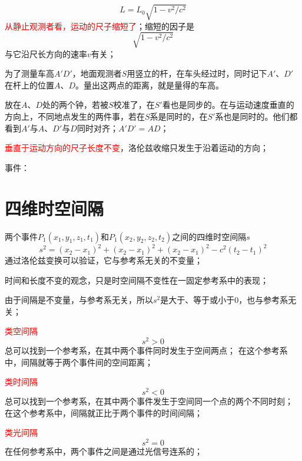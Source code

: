 \documentclass[12pt,a4paper]{article}
\begin{document}
\begin{equation}
L = L_0 \sqrt{1-v^2/c^2}
\end{equation}
\textcolor{red}{从静止观测者看，运动的尺子缩短了}；缩短的因子是
\begin{equation}
\sqrt{1-v^2/c^2}
\end{equation}
与它沿尺长方向的速率$v$有关；

为了测量车高$A'D'$，地面观测者$S$用竖立的杆，在车头经过时，同时记下$A'$、$D'$在杆上的位置$A$、$D$。量出这两点的距离，就是量得的车高。

放在$A$、$D$处的两个钟，若被$S$校准了，在$S'$看也是同步的。在与运动速度垂直的方向上，不同地点发生的两件事，若在$S$系是同时的，在$S'$系也是同时的。他们都看到$A'$与$A$、$D'$与$D$同时对齐；$A'D' = AD$；

\textcolor{red}{垂直于运动方向的尺子长度不变}，洛伦兹收缩只发生于沿着运动的方向；



事件：

\section{四维时空间隔}
两个事件$P_1(x_1,y_1,z_1,t_1)$和$P_1(x_2,y_2,z_2,t_2)$之间的四维时空间隔$s$
\begin{equation}
s^2 = (x_2 -x_1)^2 +(x_2 -x_1)^2 +(x_2 -x_1)^2 -c^2(t_2 -t_1)^2
\end{equation}
通过洛伦兹变换可以验证，它与参考系无关的不变量；

时间和长度不变的观念，只是时空间隔不变性在一固定参考系中的表现；

由于间隔是不变量，与参考系无关，所以$s^2$是大于、等于或小于$0$，也与参考系无关；

\textcolor{red}{类空间隔}
\begin{equation}
s^2 > 0
\end{equation}
总可以找到一个参考系，在其中两个事件同时发生于空间两点；
在这个参考系中，间隔就等于两个事件间的空间距离；

\textcolor{red}{类时间隔}
\begin{equation}
s^2 < 0
\end{equation}
总可以找到一个参考系，在其中两个事件发生于空间同一个点的两个不同时刻；
在这个参考系中，间隔就正比于两个事件的时间间隔；

\textcolor{red}{类光间隔}
\begin{equation}
s^2 = 0
\end{equation}
在任何参考系中，两个事件之间是通过光信号连系的；
\end{document}
